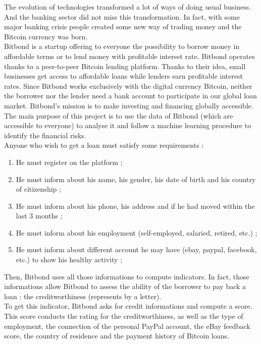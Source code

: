 The evolution of technologies transformed a lot of ways of doing usual business. And the banking sector did not miss this transformation. In fact, with some major banking crisis people created some new way of trading money and the Bitcoin currency was born.\\

Bitbond is a startup offering to everyone the possibility to borrow money in affordable terms or to lend money with profitable interest rate. Bitbond operates thanks to a peer-to-peer Bitcoin lending platform. Thanks to their idea, small businesses get access to affordable loans while lenders earn profitable interest rates. Since Bitbond works exclusively with the digital currency Bitcoin, neither the borrower nor the lender need a bank account to participate in our global loan market. Bitbond's mission is to make investing and financing globally accessible.\\

The main purpose of this project is to use the data of Bitbond (which are accessible to everyone) to analyse it and follow a machine learning procedure to identify the financial risks.\\

Anyone who wish to get a loan must satisfy some requirements :
\begin{enumerate}
    \item He must register on the platform ;
    \item He must inform about his name, his gender, his date of birth and his country of citizenship ;
    \item He must inform about his phone, his address and if he had moved within the last 3 months ;
    \item He must inform about his employment (self-employed, salaried, retired, etc.) ;
    \item He must inform about different account he may have (ebay, paypal, facebook, etc.) to show his healthy activity ;
\end{enumerate}
Then, Bitbond uses all those informations to compute indicators. In fact, those informations allow Bitbond to assess the ability of the borrower to pay back a loan : the creditworthiness (represents by a letter).\\

To get this indicator, Bitbond asks for credit informations and compute a score. This score conducts the rating for the creditworthiness, as well as the type of employment, the connection of the personal PayPal account, the eBay feedback score, the country of residence and the payment history of Bitcoin loans.